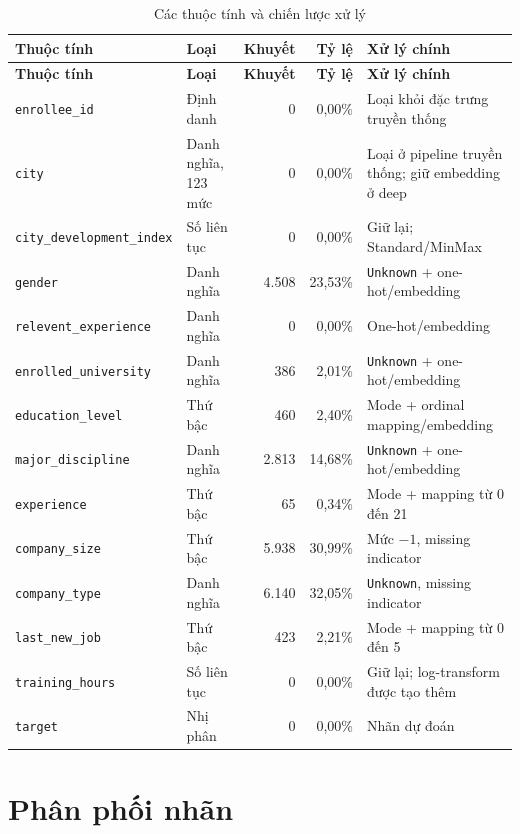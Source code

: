 \documentclass[12pt,a4paper,oneside]{report}
\newcommand{\code}[1]{\texttt{#1}}
\begin{document}
\begin{longtable}{p{} p{} r r p{}}
\caption{Các thuộc tính và chiến lược xử lý}\label{tab:data-schema}\\
\toprule
\textbf{Thuộc tính} & \textbf{Loại} & \textbf{Khuyết} & \textbf{Tỷ lệ} & \textbf{Xử lý chính} \\
\midrule
\endfirsthead
\toprule
\textbf{Thuộc tính} & \textbf{Loại} & \textbf{Khuyết} & \textbf{Tỷ lệ} & \textbf{Xử lý chính} \\
\midrule
\endhead
\bottomrule
\endfoot
\code{enrollee\_id} & Định danh & 0 & 0,00\% & Loại khỏi đặc trưng truyền thống \\
\code{city} & Danh nghĩa, 123 mức & 0 & 0,00\% & Loại ở pipeline truyền thống; giữ embedding ở deep \\
\code{city\_development\_index} & Số liên tục & 0 & 0,00\% & Giữ lại; Standard/MinMax \\
\code{gender} & Danh nghĩa & 4.508 & 23,53\% & \code{Unknown} + one-hot/embedding \\
\code{relevent\_experience} & Danh nghĩa & 0 & 0,00\% & One-hot/embedding \\
\code{enrolled\_university} & Danh nghĩa & 386 & 2,01\% & \code{Unknown} + one-hot/embedding \\
\code{education\_level} & Thứ bậc & 460 & 2,40\% & Mode + ordinal mapping/embedding \\
\code{major\_discipline} & Danh nghĩa & 2.813 & 14,68\% & \code{Unknown} + one-hot/embedding \\
\code{experience} & Thứ bậc & 65 & 0,34\% & Mode + mapping từ 0 đến 21 \\
\code{company\_size} & Thứ bậc & 5.938 & 30,99\% & Mức $-1$, missing indicator \\
\code{company\_type} & Danh nghĩa & 6.140 & 32,05\% & \code{Unknown}, missing indicator \\
\code{last\_new\_job} & Thứ bậc & 423 & 2,21\% & Mode + mapping từ 0 đến 5 \\
\code{training\_hours} & Số liên tục & 0 & 0,00\% & Giữ lại; log-transform được tạo thêm \\
\code{target} & Nhị phân & 0 & 0,00\% & Nhãn dự đoán \\
\end{longtable}

\section{Phân phối nhãn}
\end{document}
